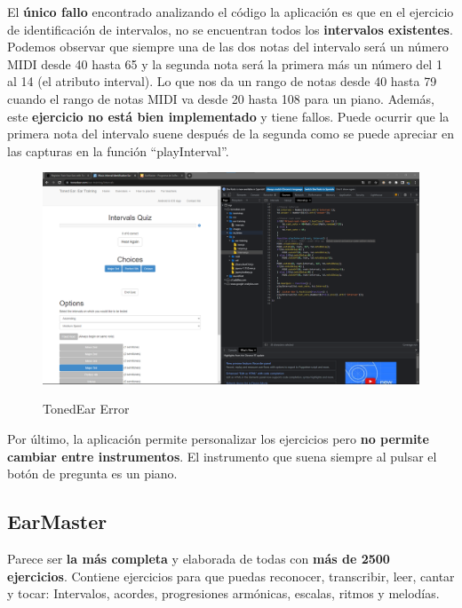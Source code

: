 \documentclass[12pt,twoside,titlepage]{report}
\begin{document}
El \textbf{único fallo} encontrado analizando el código la aplicación es que en el ejercicio de identificación de intervalos, no se encuentran todos los \textbf{intervalos existentes}. Podemos observar que siempre una de las dos notas del intervalo será un número MIDI desde 40 hasta 65 y la segunda nota será la primera más un número del 1 al 14 (el atributo interval). Lo que nos da un rango de notas desde 40 hasta 79 cuando el rango de notas MIDI va desde 20 hasta 108 para un piano. Además, este \textbf{ejercicio no está bien implementado} y tiene fallos. Puede ocurrir que la primera nota del intervalo suene después de la segunda como se puede apreciar en las capturas en la función ``playInterval''.

\begin{figure}[H] 
    \includegraphics[scale=0.25]{Estado del Arte/tonedearerror}
    \centering
    \label{fig:tonedearerror}
    \caption{TonedEar Error}
\end{figure}

Por último, la aplicación permite personalizar los ejercicios pero \textbf{no permite cambiar entre instrumentos}. El instrumento que suena siempre al pulsar el botón de pregunta es un piano.

\subsection{EarMaster}

Parece ser \textbf{la más completa} y elaborada de todas con \textbf{más de 2500 ejercicios}. Contiene ejercicios para que puedas reconocer, transcribir, leer, cantar y tocar: Intervalos, acordes, progresiones armónicas, escalas, ritmos y melodías.
\end{document}
